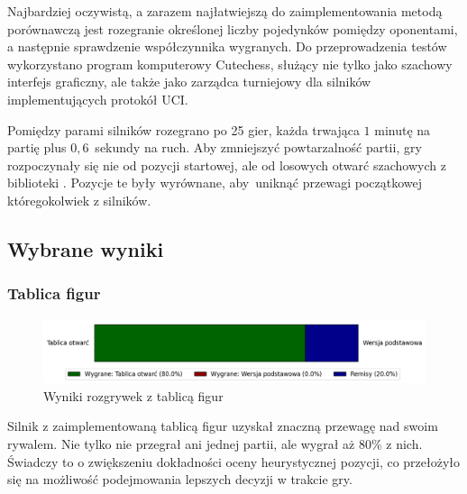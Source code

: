 Najbardziej oczywistą, a zarazem najłatwiejszą do zaimplementowania metodą porównawczą jest rozegranie określonej liczby pojedynków pomiędzy oponentami, a następnie sprawdzenie współczynnika wygranych.
Do przeprowadzenia testów wykorzystano program komputerowy Cutechess, służący nie tylko jako szachowy interfejs graficzny, ale także jako zarządca turniejowy dla silników implementujących protokół UCI.

Pomiędzy parami silników rozegrano po 25 gier, każda trwająca $1$ minutę na partię plus $0,6$~sekundy na ruch.
Aby zmniejszyć powtarzalność partii, gry rozpoczynały się nie od pozycji startowej, ale od losowych otwarć szachowych z biblioteki \cite{lichess-book}.
Pozycje te były wyrównane, aby~uniknąć przewagi początkowej któregokolwiek z silników.


\subsection{Wybrane wyniki}\label{subsec:wybrane-wyniki}

\subsubsection{Tablica figur}
\begin{figure}[ht]
    \centering
    \includegraphics[width=1\linewidth]{rozdzialy/rozdzial03/1_porownanie-wersji-silnika/rysunki/wyniki-tablica}
    \caption{Wyniki rozgrywek z tablicą figur}
    \label{fig:wyniki-tablica}
\end{figure}
Silnik z zaimplementowaną tablicą figur uzyskał znaczną przewagę nad swoim rywalem.
Nie tylko nie przegrał ani jednej partii, ale wygrał aż 80\% z nich.
Świadczy to o zwiększeniu dokładności oceny heurystycznej pozycji, co przełożyło się na możliwość podejmowania lepszych decyzji w trakcie gry.


